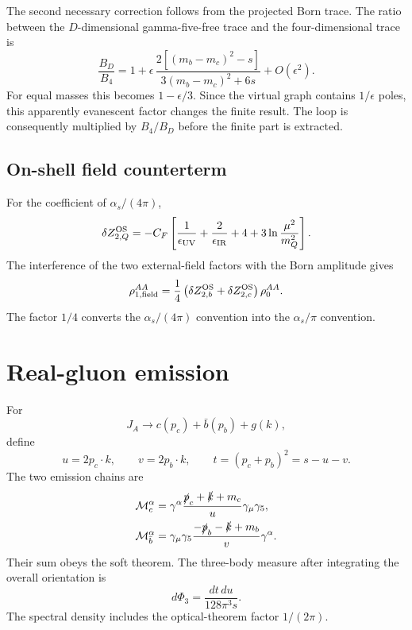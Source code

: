 \documentclass[11pt]{article}
\newcommand{\as}{\alpha_s}
\begin{document}
The second necessary correction follows from the projected Born trace.  The
ratio between the \(D\)-dimensional gamma-five-free trace and the
four-dimensional trace is
\begin{equation}
 \frac{B_D}{B_4}
 =1+\epsilon\,
 \frac{2[(m_b-m_c)^2-s]}
 {3(m_b-m_c)^2+6s}+O(\epsilon^2).
\end{equation}
For equal masses this becomes \(1-\epsilon/3\).  Since the virtual graph
contains \(1/\epsilon\) poles, this apparently evanescent factor changes the
finite result.  The loop is consequently multiplied by \(B_4/B_D\) before
the finite part is extracted.

\subsection{On-shell field counterterm}

For the coefficient of \(\as/(4\pi)\),
\begin{equation}
 \delta Z_{2,Q}^{\rm OS}
 =-C_F\left[
 \frac{1}{\epsilon_{\rm UV}}
 +\frac{2}{\epsilon_{\rm IR}}
 +4+3\ln\frac{\mu^2}{m_Q^2}
 \right].
\end{equation}
The interference of the two external-field factors with the Born amplitude
gives
\begin{equation}
 \rho_{1,\rm field}^{AA}
 =\frac14\left(\delta Z_{2,b}^{\rm OS}
 +\delta Z_{2,c}^{\rm OS}\right)\rho_0^{AA}.
\end{equation}
The factor \(1/4\) converts the \(\as/(4\pi)\) convention into the
\(\as/\pi\) convention.

\section{Real-gluon emission}

For
\begin{equation}
 J_A\longrightarrow c(p_c)+\bar b(p_b)+g(k),
\end{equation}
define
\begin{equation}
 u=2p_c\cdot k,\qquad v=2p_b\cdot k,\qquad
 t=(p_c+p_b)^2=s-u-v.
\end{equation}
The two emission chains are
\begin{align}
 {\cal M}_c^\alpha&=
 \gamma^\alpha
 \frac{\slashed p_c+\slashed k+m_c}{u}
 \gamma_\mu\gamma_5,\\
 {\cal M}_{\bar b}^\alpha&=
 \gamma_\mu\gamma_5
 \frac{-\slashed p_b-\slashed k+m_b}{v}
 \gamma^\alpha.
\end{align}
Their sum obeys the soft theorem.  The three-body measure after integrating
the overall orientation is
\begin{equation}
 d\Phi_3=\frac{dt\,du}{128\pi^3s}.
\end{equation}
The spectral density includes the optical-theorem factor \(1/(2\pi)\).
\end{document}
